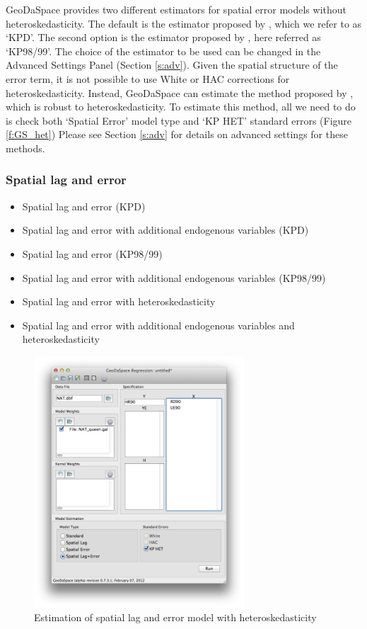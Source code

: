 \documentclass{article}
\begin{document}
GeoDaSpace provides two different estimators for spatial error models without heteroskedasticity. The default is the estimator proposed by \citet{Drukker10}, which we refer to as `KPD'. The second option is the estimator proposed by \citet{Kelejian98,Kelejian99}, here referred as `KP98/99'. The choice of the estimator to be used can be changed in the Advanced Settings Panel (Section \ref{s:adv}). Given the spatial structure of the error term, it is not possible to use White or HAC corrections for heteroskedasticity. Instead, GeoDaSpace can estimate the method proposed by \citet{Arraiz10}, which is robust to heteroskedasticity. To estimate this method, all we need to do is check both `Spatial Error' model type and `KP HET' standard errors (Figure \ref{f:GS_het}) Please see Section \ref{s:adv} for details on advanced settings for these methods.

\subsubsection*{Spatial lag and error}
\begin{itemize}
\item Spatial lag and error (KPD)
\item Spatial lag and error with additional endogenous variables (KPD)
\item Spatial lag and error (KP98/99)
\item Spatial lag and error with additional endogenous variables (KP98/99)
\item Spatial lag and error with heteroskedasticity
\item Spatial lag and error with additional endogenous variables and heteroskedasticity
\end{itemize}

\begin{figure}[htb]
\centering
\caption{Estimation of spatial lag and error model with heteroskedasticity}
\label{f:GS_het_combo}
\includegraphics[width=0.7\textwidth]{GS_het_combo.png}
\end{figure}
\end{document}
